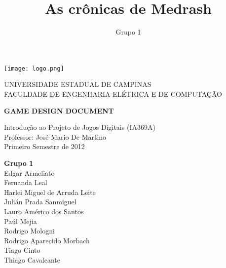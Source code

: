 \documentclass[letterpaper,11pt]{article}
\title{ As cr\^{o}nicas de Medrash }
\author{ Grupo 1 }
\date{}
\begin{document}
\begin{titlepage}
\begin{center}
\begin{minipage}{2.4 cm}
\begin{center}
\texttt{[image: logo.png]}
\end{center}
\end{minipage}
\begin{minipage}{12 cm}
\begin{center}
\Large
UNIVERSIDADE ESTADUAL DE CAMPINAS \\
FACULDADE DE ENGENHARIA ELÉTRICA E DE COMPUTAÇÃO
\end{center}
\end{minipage}
\end{center}

\vspace{5 cm}
\begin{center}
{\bf \large GAME DESIGN DOCUMENT}
\vspace{0.5 cm}

Introdução ao Projeto de Jogos Digitais (IA369A) \\
Professor: José Mario De Martino \\
Primeiro Semestre de 2012
\end{center}
\vspace{3 cm}
\begin{flushright}
{\bf Grupo 1} \\
Edgar Armeliato \\
Fernanda Leal \\
Harlei Miguel de Arruda Leite \\
Julián Prada Sanmiguel \\
Lauro Américo dos Santos \\
Paúl Mejia \\
Rodrigo Mologni \\
Rodrigo Aparecido Morbach \\
Tiago Cinto \\
Thiago Cavalcante
\end{flushright}
\end{titlepage}
\newpage
\tableofcontents
\newpage









% 



\end{document}

